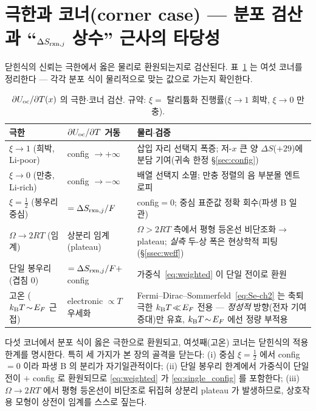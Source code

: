 \section{극한과 코너(corner case) --- 분포 검산과 ``$\Delta S_{\mathrm{rxn},j}$ 상수'' 근사의 타당성}\label{sec:limits}

닫힌식의 신뢰는 극한에서 옳은 물리로 환원되는지로 검산된다. 표~\ref{tab:limits} 는 여섯 코너를 정리한다 ---
각각 분포 식이 물리적으로 맞는 값으로 가는지 확인한다.

\begin{table}[t]
\centering\small
\renewcommand{\arraystretch}{1.35}
\caption{$\partial U_{\mathrm{oc}}/\partial T(x)$ 의 극한$\cdot$코너 검산. 규약: $\xi=$ 탈리튬화 진행률($\xi\to1$ 희박,
$\xi\to0$ 만충).}
\label{tab:limits}
\begin{tabular}{l l p{}}
\toprule
극한 & $\partial U_{\mathrm{oc}}/\partial T$ 거동 & 물리$\cdot$검증 \\
\midrule
$\xi\to1$ (희박, Li-poor) & config $\to+\infty$ & 삽입 자리 선택지 폭증; 저-$x$ 큰 양 $\Delta S$($+29$)에 분담
기여(귀속 한정 \S\ref{sec:config}) \\
$\xi\to0$ (만충, Li-rich) & config $\to-\infty$ & 배열 선택지 소멸; 만충 정렬의 음 부분몰 엔트로피 \\
$\xi=\tfrac12$ (봉우리 중심) & $=\Delta S_{\mathrm{rxn},j}/F$ & config$=0$; 중심 표준값 정확 회수(파생 B 일관) \\
$\Omega\to2RT$ (임계) & 상분리 임계(plateau) & $\Omega>2RT$ 측에서 평형 등온선 비단조화$\to$plateau;
\emph{실측} 두-상 폭은 현상학적 피팅(\S\ref{ssec:weff}) \\
단일 봉우리 (겹침 0) & $=\Delta S_{\mathrm{rxn},j}/F+$ config & 가중식~\eqref{eq:weighted} 이 단일 전이로 환원 \\
고온 ($k_{\mathrm B} T\!\sim\!E_F$ 근접) & electronic $\propto T$ 우세화 & Fermi--Dirac--Sommerfeld~\eqref{eq:Se-ch2} 는
축퇴 극한 $k_{\mathrm B} T\!\ll\!E_F$ 전용 --- \emph{정성적} 방향(전자 기여 증대)만 유효, $k_{\mathrm B} T\!\sim\!E_F$ 에선 정량
부적용 \\
\bottomrule
\end{tabular}
\end{table}

다섯 코너에서 분포 식이 옳은 극한으로 환원되고, 여섯째(고온) 코너는 닫힌식의 적용 한계를 명시한다. 특히
세 가지가 본 장의 골격을 닫는다: (i) 중심 $\xi=\tfrac12$ 에서 config$=0$ 이라 파생 B 의 분리가 자기일관적이다;
(ii) 단일 봉우리 한계에서 가중식이 단일 전이 $+$ config 로 환원되므로 \eqref{eq:weighted} 가
\eqref{eq:single_config} 를 포함한다; (iii) $\Omega\to2RT$ 에서 평형 등온선이 비단조로 뒤집혀 상분리 plateau 가
발생하므로, 상호작용 모형이 상전이 임계를 스스로 짚는다.

